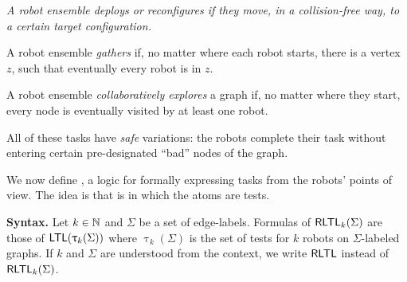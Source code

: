 \it
\- A robot ensemble {\em deploys} or {\em reconfigures} if they move, in a collision-free way, to a certain target configuration.

\- A robot ensemble {\em gathers} if, no matter where each robot starts, there is a vertex $z$, such that eventually every robot is in $z$.

\- A robot ensemble {\em collaboratively explores} a graph if, no matter where they start, every node is eventually visited by at least one robot.

\- All of these tasks have {\em safe} variations: the robots complete their task without entering certain pre-designated ``bad'' nodes of the graph.

\ti


%




%
We now define \RLTL, a logic for formally expressing tasks from the robots' points of view. The idea is that \RLTL is \LTL in which the atoms are tests.



{\bf Syntax.} Let $k \in \mathbb{N}$ and $\Sigma$ be a set of edge-labels.
Formulas of $\textsf{RLTL}_k(\Sigma)$ are those of $\mathsf{LTL}(\uptau_k(\Sigma))$ where $\uptau_k(\Sigma)$ is the set of tests for $k$ robots on $\Sigma$-labeled graphs.
If $k$ and $\Sigma$ are understood from the context, we write $\textsf{RLTL}$ instead of $\textsf{RLTL}_k(\Sigma)$.

